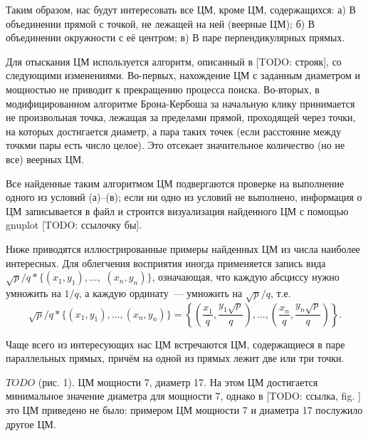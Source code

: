 \documentclass[draft, 12pt]{article}
\begin{document}
Таким образом, нас будут интересовать все ЦМ, кроме ЦМ, содержащихся:
а) В объединении прямой с точкой, не лежащей на ней (веерные ЦМ);
б) В объединении окружности с её центром;
в) В паре перпендикулярных прямых.

Для отыскания ЦМ используется алгоритм, описанный в [TODO: строяк],
со следующими изменениями.
Во-первых, нахождение ЦМ с заданным диаметром и мощностью не приводит к прекращению процесса поиска.
Во-вторых, в модифицированном алгоритме Брона-Кербоша за начальную клику
принимается не произвольная точка, лежащая за пределами прямой, проходящей через точки,
на которых достигается диаметр, а пара таких точек (если расстояние между точкми пары есть число целое).
Это отсекает значительное количество (но не все) веерных ЦМ.

Все найденные таким алгоритмом ЦМ подвергаются проверке на выполнение одного из условий (а)--(в);
если ни одно из условий не выполнено, информация о ЦМ записывается в файл и строится визуализация найденного ЦМ с помощью gnuplot
[TODO: ссылочку бы].

Ниже приводятся иллюстрированные примеры найденных ЦМ из числа наиболее интересных.
Для облегчения восприятия иногда применяется запись вида
$\sqrt{p}/q * \{ (x_1,y_1), ...,$ $ (x_n, y_n)  \}$,
означающая, что каждую абсциссу нужно умножить на $1/q$,
а каждую ординату~--- умножить на $\sqrt{p}/q$, т.е.
$$
	\sqrt{p}/q * \{ (x_1,y_1), ..., (x_n, y_n)  \}
	=
	\left\{ \left(\frac{x_1}{q},\frac{y_1\sqrt{p}}{q}\right), ..., \left(\frac{x_n}{q},\frac{y_n\sqrt{p}}{q}\right)  \right\}
	.
$$

Чаще всего из интересующих нас ЦМ встречаются ЦМ, содержащиеся в паре параллельных прямых,
причём на одной из прямых лежит две или три точки.


$ TODO $ (рис. 1).
ЦМ мощности 7, диаметр 17.
На этом ЦМ достигается минимальное значение диаметра для мощности 7,
однако в [TODO: ссылка, fig. ] это ЦМ приведено не было:
примером ЦМ мощности 7 и диаметра 17 послужило другое ЦМ.





\end{document}
